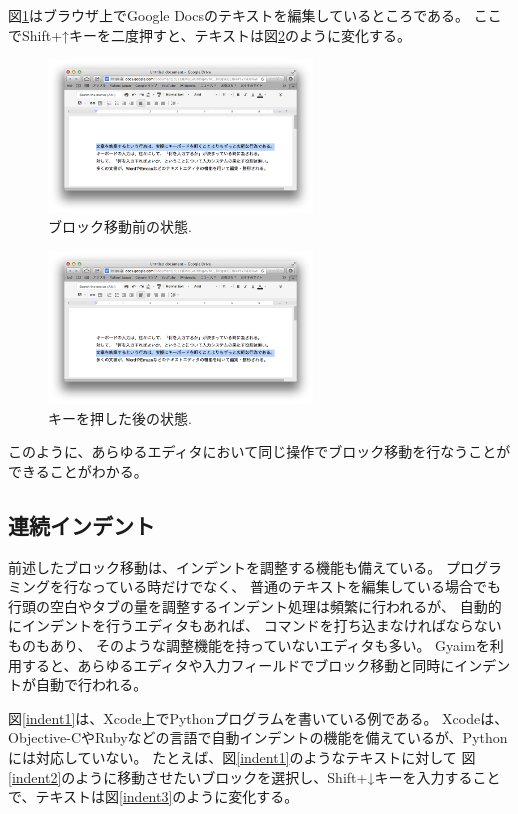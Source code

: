 図\ref{move3}はブラウザ上でGoogle Docsのテキストを編集しているところである。
ここでShift+↑キーを二度押すと、テキストは図\ref{move4}のように変化する。

\begin{figure}[H]
\centerline{\includegraphics[width=70mm,bb=0 0 935 542]{figures/block4.png}}
\caption{ブロック移動前の状態.}
\label{move3}
\end{figure}

\begin{figure}[H]
\centerline{\includegraphics[width=70mm,bb=0 0 935 542]{figures/block5.png}}
\caption{キーを押した後の状態.}
\label{move4}
\end{figure}

このように、あらゆるエディタにおいて同じ操作でブロック移動を行なうことができることがわかる。

\subsection{連続インデント}

前述したブロック移動は、インデントを調整する機能も備えている。
プログラミングを行なっている時だけでなく、
普通のテキストを編集している場合でも
行頭の空白やタブの量を調整するインデント処理は頻繁に行われるが、
自動的にインデントを行うエディタもあれば、
コマンドを打ち込まなければならないものもあり、
そのような調整機能を持っていないエディタも多い。
Gyaimを利用すると、あらゆるエディタや入力フィールドでブロック移動と同時にインデントが自動で行われる。

図\ref{indent1}は、Xcode上でPythonプログラムを書いている例である。
Xcodeは、Objective-CやRubyなどの言語で自動インデントの機能を備えているが、Pythonには対応していない。
たとえば、図\ref{indent1}のようなテキストに対して
図\ref{indent2}のように移動させたいブロックを選択し、Shift+↓キーを入力することで、テキストは図\ref{indent3}のように変化する。

